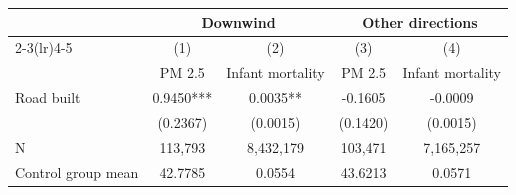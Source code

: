 {
\def\sym#1{\ifmmode^{#1}\else\(^{#1}\)\fi}
\begin{tabular}{l*{4}{c}}
\hline\hline
                         &\multicolumn{2}{c}{Downwind}   &\multicolumn{2}{c}{Other directions}\\\cmidrule(lr){2-3}\cmidrule(lr){4-5}
                         &\multicolumn{1}{c}{(1)}&\multicolumn{1}{c}{(2)}&\multicolumn{1}{c}{(3)}&\multicolumn{1}{c}{(4)}\\
                         &\multicolumn{1}{c}{PM 2.5}&\multicolumn{1}{c}{Infant mortality}&\multicolumn{1}{c}{PM 2.5}&\multicolumn{1}{c}{Infant mortality}\\
\hline
Road built               &      0.9450***&      0.0035** &     -0.1605   &     -0.0009   \\
                         &    (0.2367)   &    (0.0015)   &    (0.1420)   &    (0.0015)   \\
\hline
N                        &     113,793   &   8,432,179   &     103,471   &   7,165,257   \\
Control group mean       &     42.7785   &      0.0554   &     43.6213   &      0.0571   \\
\hline\hline
\end{tabular}
}
